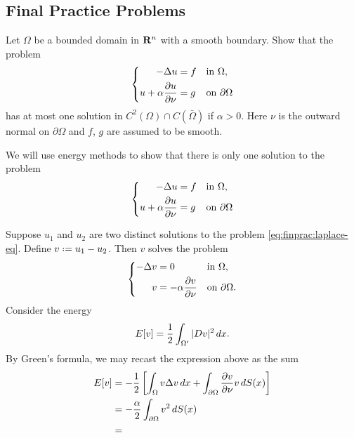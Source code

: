 \subsection{Final Practice Problems}
\begin{problem}
  Let \(\Omega\) be a bounded domain in \(\mathbf{R}^n\) with a smooth
  boundary. Show that the problem
  \[
    \left\{
      \begin{aligned}
        -\Delta u&=f&&\text{in \(\Omega\),}\\
        u+\alpha\frac{\partial u}{\partial\nu}&=g&&\text{on \(\partial\Omega\)}
      \end{aligned}
    \right.
  \]
  has at most one solution in \(C^2(\Omega)\cap C(\bar\Omega)\) if
  \(\alpha>0\). Here \(\nu\) is the outward normal on \(\partial\Omega\)
  and \(f\), \(g\) are assumed to be smooth.
\end{problem}
\begin{solution*}
  We will use energy methods to show that there is only one solution to the
  problem
  \begin{equation}
    \label{eq:finprac:laplace-eq}
    \left\{
      \begin{aligned}
        -\Delta u&=f&&\text{in \(\Omega\),}\\
        u+\alpha\frac{\partial u}{\partial\nu}&=g&&\text{on \(\partial\Omega\)}
      \end{aligned}
    \right.
  \end{equation}

  Suppose \(u_1\) and \(u_2\) are two distinct solutions to the problem
  \eqref{eq:finprac:laplace-eq}. Define \(v\defeq u_1-u_2\). Then \(v\)
  solves the problem
  \[
    \left\{
      \begin{aligned}
        -\Delta v&=0&&\text{in \(\Omega\),}\\
        v&=-\alpha\frac{\partial v}{\partial\nu}&&\text{on \(\partial\Omega\).}
      \end{aligned}
    \right.
  \]
  Consider the energy
  \[
    E[v]=\frac{1}{2}\int_{\Omega'}|Dv|^2\mathop{}\!d x.
  \]
  By Green's formula, we may recast the expression above as the sum
  \begin{align*}
    E[v]
    &=-\frac{1}{2}
      \left[%
      \int_\Omega v\Lap v\diff x%
      +\int_{\partial\Omega}\frac{\partial v}{\partial\nu }v\diff S(x)%
      \right]\\
    &=-\frac{\alpha}{2}\int_{\partial\Omega} v^2\diff S(x)\\
    &=
  \end{align*}
\end{solution*}

